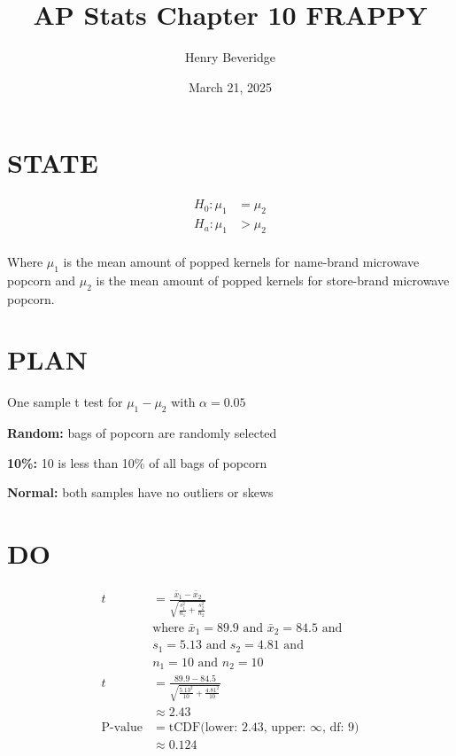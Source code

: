 \documentclass{article}
\title{AP Stats Chapter 10 FRAPPY}
\author{Henry Beveridge}
\date{March 21, 2025}
\begin{document}

\maketitle

\section*{STATE}

\begin{align*}
  H_0: \mu_1 &= \mu_2 \\
  H_a: \mu_1 &> \mu_2 \\
\end{align*}

Where $\mu_1$ is the mean amount of popped kernels for name-brand microwave popcorn and $\mu_2$ is the mean amount of popped kernels for store-brand microwave popcorn.

\section*{PLAN}

One sample t test for $\mu_1 - \mu_2$ with $\alpha = 0.05$


\textbf{Random:} bags of popcorn are randomly selected

\textbf{10\%:} 10 is less than 10\% of all bags of popcorn

\textbf{Normal:} both samples have no outliers or skews

\section*{DO}

\begin{align*}
  t &= \frac{\bar{x}_1 - \bar{x}_2}{\sqrt{\frac{s_1^2}{n_1} + \frac{s_2^2}{n_2}}} \\
  &\text{where } \bar{x}_1 = 89.9 \text{ and } \bar{x}_2 = 84.5 \text{ and} \\
  &s_1 = 5.13 \text{ and } s_2 = 4.81 \text{ and} \\
  &n_1 = 10 \text{ and } n_2 = 10 \\
  t &= \frac{89.9 - 84.5}{\sqrt{\frac{5.13^2}{10} + \frac{4.81^2}{10}}} \\
  &\approx 2.43 \\
  \text{P-value} &= \text{tCDF(lower: 2.43, upper: $\infty$, df: 9)} \\
  &\approx 0.124 \\
\end{align*}
\end{document}
